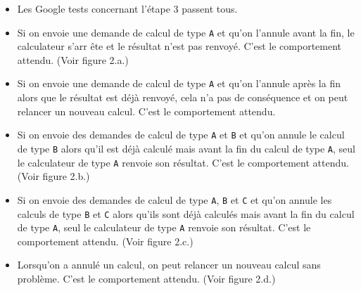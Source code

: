 \documentclass{article}
\begin{document}
\begin{itemize}
    \item Les Google tests concernant l'étape 3 passent tous.
    \item Si on envoie une demande de calcul de type \texttt{A} et qu'on l'annule avant la fin, le calculateur s'arr
    ête et le résultat n'est pas renvoyé. C'est le comportement attendu. (Voir figure 2.a.)
    \item Si on envoie une demande de calcul de type \texttt{A} et qu'on l'annule après la fin alors que le résultat
    est déjà renvoyé, cela n'a pas de conséquence et on peut relancer un nouveau calcul. C'est le comportement attendu.
    \item Si on envoie des demandes de calcul de type \texttt{A} et \texttt{B} et qu'on annule le calcul de type \texttt{B}
    alors qu'il est déjà calculé mais avant la fin du calcul de type \texttt{A}, seul le calculateur de type \texttt{A}
    renvoie son résultat. C'est le comportement attendu. (Voir figure 2.b.)
    \item Si on envoie des demandes de calcul de type \texttt{A}, \texttt{B} et \texttt{C} et qu'on annule les
    calculs de type \texttt{B} et \texttt{C} alors qu'ils sont déjà calculés mais avant la fin du calcul de type \texttt{A},
    seul le calculateur de type \texttt{A} renvoie son résultat. C'est le comportement attendu. (Voir figure 2.c.)
    \item Lorsqu'on a annulé un calcul, on peut relancer un nouveau calcul sans problème. C'est le comportement
    attendu. (Voir figure 2.d.)
\end{itemize}
\end{document}
